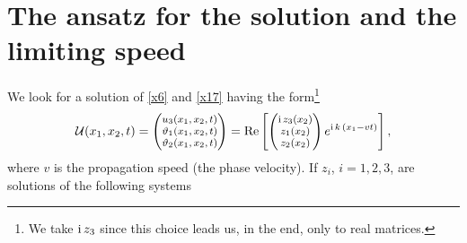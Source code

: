 \documentclass[10pt]{article}
\begin{document}
 \section{The ansatz for the solution and the limiting speed}\label{anzsec}\setcounter{equation}{0}
 We look for a solution of \eqref{x6} and \eqref{x17} having the form\footnote{We take ${\rm i}\,z_3$ since this choice leads us, in the end, only to real matrices.}
 \begin{align}\label{x5}
 \mathcal{U}(x_1,x_2,t)=\begin{footnotesize}\begin{pmatrix}u_3(x_1,x_2,t)
 	\\
 	\vartheta_1(x_1,x_2,t)
 	\\\vartheta _2(x_1,x_2,t)
 	\end{pmatrix}\end{footnotesize}={\rm Re}\left[\begin{footnotesize}\begin{pmatrix} {\rm i}\,z_3(x_2)
 	\\
 	z_1(x_2)
 	\\z_2(x_2)
 \end{pmatrix}\end{footnotesize} e^{ {\rm i}\, k\, (  x_1-vt)}\right],
 \end{align}
 where  $v$ is the propagation speed {(the phase  velocity)}. If $z_i$, $i=1,2,3$, are solutions of the following systems
\end{document}

